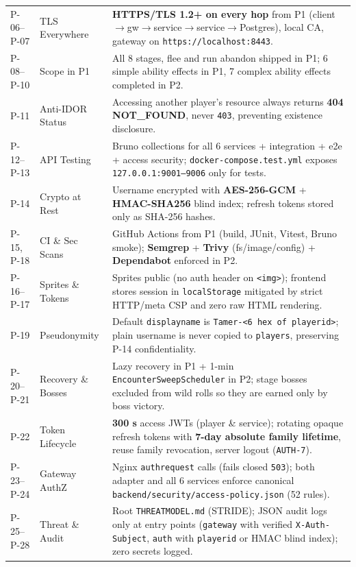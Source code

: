 \documentclass[10.5pt,a4paper]{article}
\DeclareRobustCommand{\code}[1]{\begingroup\def\_{\textunderscore\allowbreak}\texttt{#1}\endgroup}
\begin{document}
\begin{xltabular}{\linewidth}{@{}L{1.15cm}L{3.1cm}Y@{}}
P-06–P-07 & TLS Everywhere & \textbf{HTTPS/TLS 1.2+ on every hop} from P1 (client$\to$gw$\to$service$\to$service$\to$Postgres), local CA, gateway on \code{https://localhost:8443}. \\
P-08–P-10 & Scope in P1 & All 8 stages, flee and run abandon shipped in P1; 6 simple ability effects in P1, 7 complex ability effects completed in P2. \\
P-11 & Anti-IDOR Status & Accessing another player's resource always returns \textbf{404 NOT\_FOUND}, never \code{403}, preventing existence disclosure. \\
P-12–P-13 & API Testing & Bruno collections for all 6 services + integration + e2e + access security; \code{docker-compose.test.yml} exposes \code{127.0.0.1:9001–9006} only for tests. \\
P-14 & Crypto at Rest & Username encrypted with \textbf{AES-256-GCM} + \textbf{HMAC-SHA256} blind index; refresh tokens stored only as SHA-256 hashes. \\
P-15, P-18 & CI \& Sec Scans & GitHub Actions from P1 (build, JUnit, Vitest, Bruno smoke); \textbf{Semgrep} + \textbf{Trivy} (fs/image/config) + \textbf{Dependabot} enforced in P2. \\
P-16–P-17 & Sprites \& Tokens & Sprites public (no auth header on \code{<img>}); frontend stores session in \code{localStorage} mitigated by strict HTTP/meta CSP and zero raw HTML rendering. \\
P-19 & Pseudonymity & Default \code{display\_name} is \code{Tamer-<6 hex of player\_id>}; plain username is never copied to \code{players}, preserving P-14 confidentiality. \\
P-20–P-21 & Recovery \& Bosses & Lazy recovery in P1 + 1-min \code{EncounterSweepScheduler} in P2; stage bosses excluded from wild rolls so they are earned only by boss victory. \\
P-22 & Token Lifecycle & \textbf{300 s} access JWTs (player \& service); rotating opaque refresh tokens with \textbf{7-day absolute family lifetime}, reuse family revocation, server logout (\code{AUTH-7}). \\
P-23–P-24 & Gateway AuthZ & Nginx \code{auth\_request} calls  (fails closed \code{503}); both adapter and all 6 services enforce canonical \code{backend/security/access-policy.json} (52 rules). \\
P-25–P-28 & Threat \& Audit & Root \code{THREAT\_MODEL.md} (STRIDE); JSON audit logs only at entry points (\code{gateway} with verified \code{X-Auth-Subject}, \code{auth} with \code{player\_id} or HMAC blind index); zero secrets logged. \\
\end{xltabular}
\end{document}

